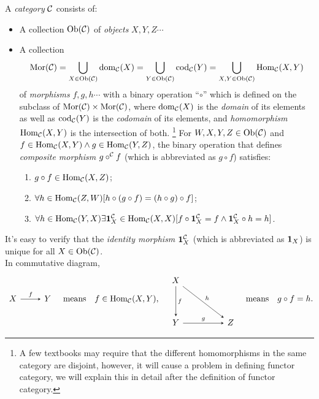 \documentclass{article}
\begin{document}
\begin{defi}\label{category}
	A \emph{category} $\mathcal{C}$ consists of:
	\begin{itemize}
		\item A collection $\mathrm{Ob}(\mathcal{C})$ of \emph{objects} $X,Y,Z\cdots$
		\item A collection 
			$$\mathrm{Mor}(\mathcal{C})=\bigcup_{X\in\mathrm{Ob}(\mathcal{C})}{\mathrm{dom}_{\mathcal{C}}(X)}=\bigcup_{Y\in\mathrm{Ob}(\mathcal{C})}{\mathrm{cod}_{\mathcal{C}}(Y)}=\bigcup_{X,Y\in\mathrm{Ob}(\mathcal{C})}{\mathrm{Hom}_{\mathcal{C}}(X,Y)}$$
			of \emph{morphisms} $f,g,h\cdots$ with a binary operation ``$\circ$'' which is defined on the subclass of $\mathrm{Mor}(\mathcal{C})\times\mathrm{Mor}(\mathcal{C})$, where $\mathrm{dom}_{\mathcal{C}}(X)$ is the \emph{domain} of its elements as well as $\mathrm{cod}_{\mathcal{C}}(Y)$ is the \emph{codomain} of its elements, and \emph{homomorphism} $\mathrm{Hom}_{\mathcal{C}}(X,Y)$ is the intersection of both.
				\footnote{A few textbooks may require that the different homomorphisms in the same category are disjoint, however, it will cause a problem in defining functor category, we will explain this in detail after the definition of functor category.}
			For $W,X,Y,Z\in\mathrm{Ob}(\mathcal{C})$ and $f\in\mathrm{Hom}_{\mathcal{C}}(X,Y)\wedge g\in\mathrm{Hom}_{\mathcal{C}}(Y,Z)$, the binary operation that defines \emph{composite morphism} $g\circ^{\mathcal{C}} f$ (which is abbreviated as $g\circ f$) satisfies:
			\begin{enumerate}
				\item $g\circ f\in\mathrm{Hom}_{\mathcal{C}}(X,Z)$;
				\item $\forall h\in\mathrm{Hom}_{\mathcal{C}}(Z,W)[h\circ(g\circ f)=(h\circ g)\circ f]$;
				\item $\forall h\in\mathrm{Hom}_{\mathcal{C}}(Y,X)\exists \mathbf{1}^{\mathcal{C}}_X\in\mathrm{Hom}_{\mathcal{C}}(X,X)[f\circ\mathbf{1}^{\mathcal{C}}_X=f\wedge\mathbf{1}^{\mathcal{C}}_X\circ h=h]$.
			\end{enumerate}
	\end{itemize}
	
	It's easy to verify that the \emph{identity morphism} $\mathbf{1}^{\mathcal{C}}_X$ (which is abbreviated as $\mathbf{1}_X$) is unique for all $X\in\mathrm{Ob}(\mathcal{C})$.\\
	
	In commutative diagram,
	\[\begin{tikzcd}
			X\arrow[->,>=stealth,r,"f"] & Y
		\end{tikzcd}\quad\text{means}\quad f\in\Hom_\C(X,Y),\quad
		\begin{tikzcd}
			X\arrow[->,>=stealth,dd,"f"]\arrow[->,>=stealth,rrdd,"h"] & & \\ & & \\
			Y\arrow[->,>=stealth,rr,"g"] & & Z
	\end{tikzcd}\quad\text{means}\quad g\circ f=h.\]
\end{defi}
\end{document}
